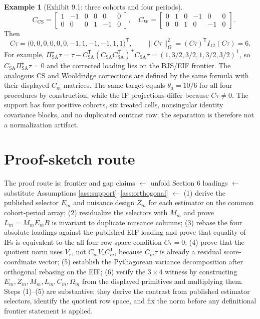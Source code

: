 \documentclass[11pt]{article}
\newcommand{\transpose}{\mathsf{T}}
\theoremstyle{definition}
\newtheorem{example}{Example}
\theoremstyle{plain}
\theoremstyle{remark}
\begin{document}
\begin{example}[Exhibit 9.1: three cohorts and four periods]
\[\quad
C_{\mathrm{CS}}=\begin{bmatrix}1&-1&0&0&0&0\\0&0&0&1&-1&0\end{bmatrix},
\quad
C_{\mathrm{W}}=\begin{bmatrix}0&1&0&-1&0&0\\0&0&1&0&-1&0\end{bmatrix}.
\]
Then
\[
C\tau=
\bigl(0,0,0,0,0,0,-1,1,-1,-1,1,1\bigr)^\transpose,\qquad
\|C\tau\|_{\Omega}^2=(C\tau)^\transpose I_{12}(C\tau)=6 .
\]
For example, $\Pi^\star_{\mathrm{SA}}\tau
=\tau-C_{\mathrm{SA}}^\transpose(C_{\mathrm{SA}}C_{\mathrm{SA}}^\transpose)^+
C_{\mathrm{SA}}\tau
=(1,3/2,3/2,1,3/2,3/2)^\transpose$, so
$C_{\mathrm{SA}}\Pi^\star_{\mathrm{SA}}\tau=0$ and the corrected loading lies
on the BJS/EIF frontier.  The analogous CS and Wooldridge corrections are
defined by the same formula with their displayed $C_m$ matrices.
The same target equals $\theta_a=10/6$ for all four procedures by
construction, while the IF projections differ because $C\tau\ne0$.  The
support has four positive cohorts, six treated cells, nonsingular identity
covariance blocks, and no duplicated contrast row; the separation is therefore
not a normalization artifact.
\end{example}

\section{Proof-sketch route}
The proof route is:
frontier and gap claims $\leftarrow$ unfold Section 6 loadings
$\leftarrow$ substitute Assumptions \ref{ass:support}--\ref{ass:orthogonal}
$\leftarrow$ (1) derive the published selector $E_m$ and nuisance design
$Z_m$ for each estimator on the common cohort-period array; (2) residualize
the selectors with $M_m$ and prove $L_m=M_mE_mB$ is invariant to duplicate
nuisance columns; (3) rebase the four absolute loadings against the published
EIF loading and prove that equality of IFs is equivalent to the all-four
row-space condition $C\tau=0$; (4) prove that the quotient norm uses
$V_r$, not $C_mV_rC_m^\transpose$, because $C_m\tau$ is already a residual
score-coordinate vector; (5) establish the Pythagorean variance decomposition
after orthogonal rebasing on the EIF; (6) verify the $3\times4$ witness by
constructing $E_m,Z_m,M_m,L_m,C_m,\Omega_m$ from the displayed primitives and
multiplying them.  Steps (1)--(5) are substantive: they derive the contrast
from published estimator selectors, identify the quotient row space, and fix
the norm before any definitional frontier statement is applied.
\end{document}
